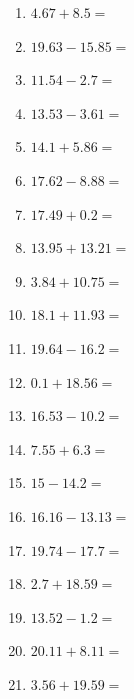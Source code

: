 \documentclass[12pt]{article}
\begin{document}
\begin{enumerate}
\item \large $ 4.67 + 8.5 = $ \vspace{1.5cm}
\item \large $ 19.63 - 15.85 = $ \vspace{1.5cm}
\item \large $ 11.54 - 2.7 = $ \vspace{1.5cm}
\item \large $ 13.53 - 3.61 = $ \vspace{1.5cm}
\item \large $ 14.1 + 5.86 = $ \vspace{1.5cm}
\newpage
\item \large $ 17.62 - 8.88 = $ \vspace{1.5cm}
\item \large $ 17.49 + 0.2 = $ \vspace{1.5cm}
\item \large $ 13.95 + 13.21 = $ \vspace{1.5cm}
\item \large $ 3.84 + 10.75 = $ \vspace{1.5cm}
\item \large $ 18.1 + 11.93 = $ \vspace{1.5cm}
\item \large $ 19.64 - 16.2 = $ \vspace{1.5cm}
\item \large $ 0.1 + 18.56 = $ \vspace{1.5cm}
\item \large $ 16.53 - 10.2 = $ \vspace{1.5cm}
\item \large $ 7.55 + 6.3 = $ \vspace{1.5cm}
\item \large $ 15 - 14.2 = $ \vspace{1.5cm}
\newpage
\item \large $ 16.16 - 13.13 = $ \vspace{1.5cm}
\item \large $ 19.74 - 17.7 = $ \vspace{1.5cm}
\item \large $ 2.7 + 18.59 = $ \vspace{1.5cm}
\item \large $ 13.52 - 1.2 = $ \vspace{1.5cm}
\item \large $ 20.11 + 8.11 = $ \vspace{1.5cm}
\item \large $ 3.56 + 19.59 = $ \vspace{1.5cm}

\end{enumerate}
\end{document}
